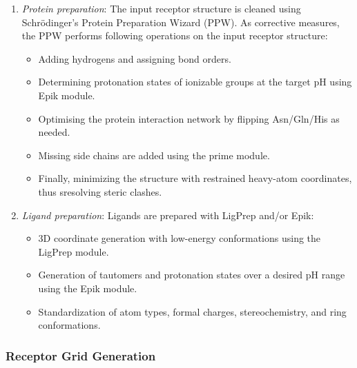 \documentclass[12pt, a4paper]{article}
\begin{document}
\begin{enumerate}
  \item \textit{Protein preparation}: The input receptor structure is cleaned using Schr\"{o}dinger's Protein Preparation Wizard (PPW). As corrective measures, the PPW performs following operations on the input receptor structure:
    \begin{itemize}
      \item Adding hydrogens and assigning bond orders.
      \item Determining protonation states of ionizable groups at the target pH using Epik\cite{CH7_epik} module.
      \item Optimising the protein interaction network by flipping Asn/Gln/His as needed.
      \item Missing side chains are added using the prime module.
      \item Finally, minimizing the structure with restrained heavy-atom coordinates, thus sresolving steric clashes.
    \end{itemize}

  \item \textit{Ligand preparation}: Ligands are prepared with LigPrep and/or Epik:
    \begin{itemize}
      \item 3D coordinate generation with low-energy conformations using the LigPrep module.
      \item Generation of tautomers and protonation states over a desired pH range using the Epik module.
      \item Standardization of atom types, formal charges, stereochemistry, and ring conformations.
    \end{itemize}
\end{enumerate}

\subsubsection{Receptor Grid Generation}
\end{document}
